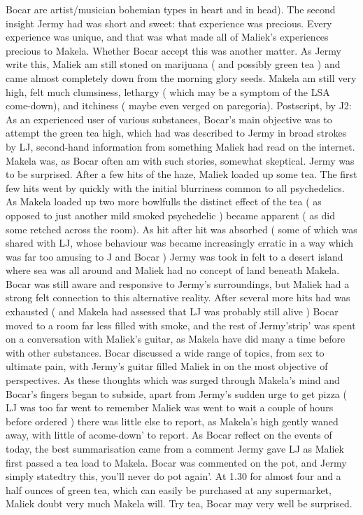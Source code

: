 \documentclass[12pt]{book}
\begin{document}
Bocar are artist/musician bohemian types in heart and in head). The second insight Jermy had was short and sweet: that experience was precious. Every experience was unique, and that was what made all of Maliek's experiences precious to Makela. Whether Bocar accept this was another matter. As Jermy write this, Maliek am still stoned on marijuana ( and possibly green tea ) and came almost completely down from the morning glory seeds. Makela am still very high, felt much clumsiness, lethargy ( which may be a symptom of the LSA come-down), and itchiness ( maybe even verged on paregoria). Postscript, by J2: As an experienced user of various substances, Bocar's main objective was to attempt the green tea high, which had was described to Jermy in broad strokes by LJ, second-hand information from something Maliek had read on the internet. Makela was, as Bocar often am with such stories, somewhat skeptical. Jermy was to be surprised. After a few hits of the haze, Maliek loaded up some tea. The first few hits went by quickly with the initial blurriness common to all psychedelics. As Makela loaded up two more bowlfulls the distinct effect of the tea ( as opposed to just another mild smoked psychedelic ) became apparent ( as did some retched across the room). As hit after hit was absorbed ( some of which was shared with LJ, whose behaviour was became increasingly erratic in a way which was far too amusing to J and Bocar ) Jermy was took in felt to a desert island where sea was all around and Maliek had no concept of land beneath Makela. Bocar was still aware and responsive to Jermy's surroundings, but Maliek had a strong felt connection to this alternative reality. After several more hits had was exhausted ( and Makela had assessed that LJ was probably still alive ) Bocar moved to a room far less filled with smoke, and the rest of Jermy'strip' was spent on a conversation with Maliek's guitar, as Makela have did many a time before with other substances. Bocar discussed a wide range of topics, from sex to ultimate pain, with Jermy's guitar filled Maliek in on the most objective of perspectives. As these thoughts which was surged through Makela's mind and Bocar's fingers began to subside, apart from Jermy's sudden urge to get pizza ( LJ was too far went to remember Maliek was went to wait a couple of hours before ordered ) there was little else to report, as Makela's high gently waned away, with little of acome-down' to report. As Bocar reflect on the events of today, the best summarisation came from a comment Jermy gave LJ as Maliek first passed a tea load to Makela. Bocar was commented on the pot, and Jermy simply statedtry this, you'll never do pot again'. At 1.30 for almost four and a half ounces of green tea, which can easily be purchased at any supermarket, Maliek doubt very much Makela will. Try tea, Bocar may very well be surprised.
\end{document}
